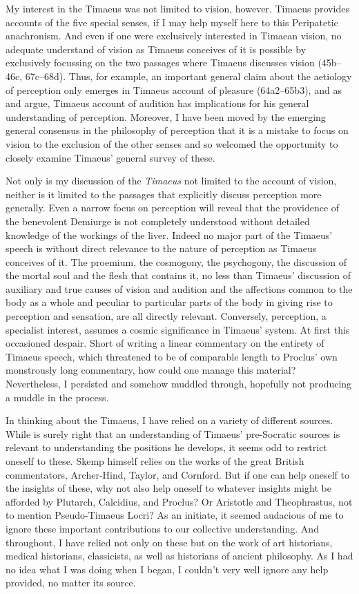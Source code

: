 My interest in the Timaeus was not limited to vision, however. Timaeus provides accounts of the five special senses, if I may help myself here to this Peripatetic anachronism. And even if one were exclusively interested in Timaean vision, no adequate understand of vision as Timaeus conceives of it is possible by exclusively focussing on the two passages where Timaeus discusses vision (45b–46c, 67c–68d). Thus, for example, an important general claim about the aetiology of perception only emerges in Timaeus account of pleasure (64a2–65b3), and as \citet{Barker:2000dy} and \citet{Lautner:2005aa} argue, Timaeus account of audition has implications for his general understanding of perception. Moreover, I have been moved by the emerging general consensus in the philosophy of perception that it is a mistake to focus on vision to the exclusion of the other senses and so welcomed the opportunity to closely examine Timaeus' general survey of these.

Not only is my discussion of the \emph{Timaeus} not limited to the account of vision, neither is it limited to the passages that explicitly discuss perception more generally. Even a narrow focus on perception will reveal that the providence of the benevolent Demiurge is not completely understood without detailed knowledge of the workings of the liver. Indeed no major part of the Timaeus' speech is without direct relevance to the nature of perception as Timaeus conceives of it. The proemium, the cosmogony, the psychogony, the discussion of the mortal soul and the flesh that contains it, no less than Timaeus' discussion of auxiliary and true causes of vision and audition and the affections common to the body as a whole and peculiar to particular parts of the body in giving rise to perception and sensation, are all directly relevant. Conversely, perception, a specialist interest, assumes a cosmic significance in Timaeus' system. At first this occasioned despair. Short of writing a linear commentary on the entirety of Timaeus speech, which threatened to be of comparable length to Proclus' own monstrously long commentary, how could one manage this material? Nevertheless, I persisted and somehow muddled through, hopefully not producing a muddle in the process.

In thinking about the Timaeus, I have relied on a variety of different sources. While \citet{Skemp:1942oc} is surely right that an understanding of Timaeus' pre-Socratic sources is relevant to understanding the positions he develops, it seems odd to restrict oneself to these. Skemp himself relies on the works of the great British commentators, Archer-Hind, Taylor, and Cornford. But if one can help oneself to the insights of these, why not also help oneself to whatever insights might be afforded by Plutarch, Calcidius, and Proclus? Or Aristotle and Theophrastus, not to mention Pseudo-Timaeus Locri? As an initiate, it seemed audacious of me to ignore these important contributions to our collective understanding. And throughout, I have relied not only on these but on the work of art historians, medical historians, classicists, as well as historians of ancient philosophy. As I had no idea what I was doing when I began, I couldn't very well ignore any help provided, no matter its source.

